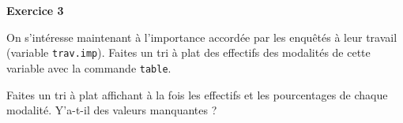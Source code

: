 \documentclass[12pt,]{book}
\newenvironment{Shaded}{\begin{snugshade}}{\end{snugshade}}
\newcommand{\DataTypeTok}[1]{\textcolor[rgb]{0.27,0.27,0.27}{#1}}
\newcommand{\DecValTok}[1]{\textcolor[rgb]{0.06,0.06,0.06}{#1}}
\newcommand{\KeywordTok}[1]{\textcolor[rgb]{0.27,0.27,0.27}{\textbf{#1}}}
\newcommand{\NormalTok}[1]{#1}
\newcommand{\OperatorTok}[1]{\textcolor[rgb]{0.43,0.43,0.43}{\textbf{#1}}}
\begin{document}

\textbf{Exercice 3}

On s'intéresse maintenant à l'importance accordée par les enquêtés à leur travail (variable \texttt{trav.imp}). Faites un tri à plat des effectifs des modalités de cette variable avec la commande \texttt{table}.

\iffalse

\begin{solution}

\begin{Shaded}
\begin{Highlighting}[]
\KeywordTok{table}\NormalTok{(df}\OperatorTok{$}\NormalTok{trav.imp)}
\end{Highlighting}
\end{Shaded}

\end{solution}

\fi

Faites un tri à plat affichant à la fois les effectifs et les pourcentages de chaque modalité. Y'a-t-il des valeurs manquantes ?

\end{document}
